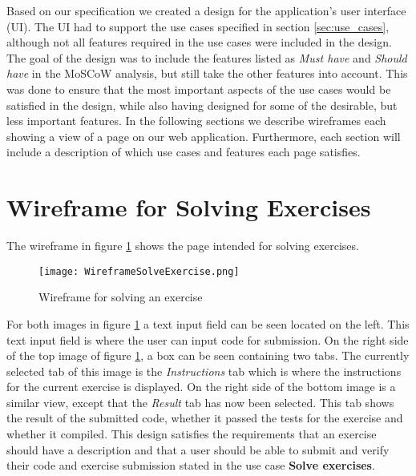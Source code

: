 Based on our specification we created a design for the application's user interface (UI). The UI had to support the use cases specified in section \ref*{sec:use_cases}, although not all features required in the use cases were included in the design. The goal of the design was to include the features listed as \textit{Must have} and \textit{Should have} in the MoSCoW analysis, but still take the other features into account. This was done to ensure that the most important aspects of the use cases would be satisfied in the design, while also having designed for some of the desirable, but less important features.
In the following sections we describe wireframes each showing a view of a page on our web application. Furthermore, each section will include a description of which use cases and features each page satisfies.

\section{Wireframe for Solving Exercises}
The wireframe in figure \ref{fig:wfExercise} shows the page intended for solving exercises.
\begin{figure}[H]
	\texttt{[image: WireframeSolveExercise.png]}
	\centering
	\caption{Wireframe for solving an exercise}
	\label{fig:wfExercise}
\end{figure}

For both images in figure \ref{fig:wfExercise} a text input field can be seen located on the left. This text input field is where the user can input code for submission. On the right side of the top image of figure \ref{fig:wfExercise}, a box can be seen containing two tabs. The currently selected tab of this image is the \textit{Instructions} tab which is where the instructions for the current exercise is displayed. On the right side of the bottom image is a similar view, except that the \textit{Result} tab has now been selected. This tab shows the result of the submitted code, whether it passed the tests for the exercise and whether it compiled. This design satisfies the requirements that an exercise should have a description and that a user should be able to submit and verify their code and exercise submission stated in the use case \textbf{Solve exercises}.


